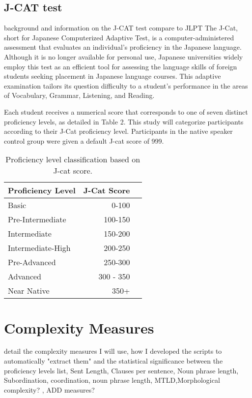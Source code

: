\subsection{J-CAT test}
background and information on the J-CAT test compare to JLPT
The J-Cat, short for Japanese Computerized Adaptive Test, is a computer-administered assessment that evaluates an individual's proficiency in the Japanese language. Although it is no longer available for personal use, Japanese universities widely employ this test as an efficient tool for assessing the language skills of foreign students seeking placement in Japanese language courses. This adaptive examination tailors its question difficulty to a student's performance in the areas of Vocabulary, Grammar, Listening, and Reading.

Each student receives a numerical score that corresponds to one of seven distinct proficiency levels, as detailed in Table 2. This study will categorize participants according to their J-Cat proficiency level. Participants in the native speaker control group were given a default J-cat score of 999.

\begin{table}
\centering
\begin{tabular}{lrl}
\hline \textbf{Proficiency Level} & \textbf{J-Cat Score} \\ \hline
Basic & 0-100 \\
Pre-Intermediate & 100-150 \\
Intermediate & 150-200 \\
Intermediate-High & 200-250 \\
Pre-Advanced & 250-300 \\
Advanced & 300 - 350 \\
Near Native & 350+\\
\hline
\end{tabular}
\caption{\label{font-table} Proficiency level classification based on J-cat score.  }
\end{table}


\section{Complexity Measures}
detail the complexity measures I will use, how I developed the scripts to automatically "extract them" and the statistical significance between the proficiency levels
list, Sent Length, Clauses per sentence, Noun phrase length,  Subordination, coordination, noun phrase length, MTLD,Morphological complexity? , ADD measures?

